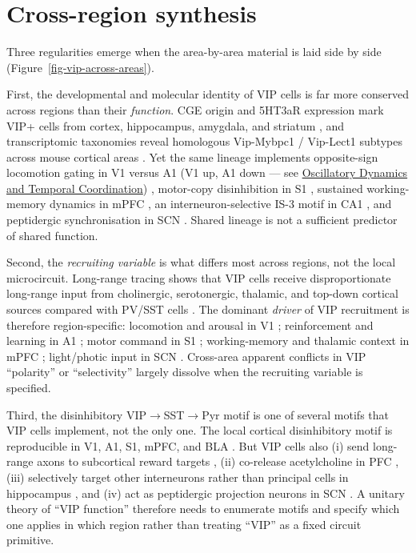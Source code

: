 \documentclass[11pt]{article}
\let\origrightarrow\rightarrow
\def\rightarrow{\ensuremath{\origrightarrow}}
\begin{document}
\section{Cross-region synthesis}

Three regularities emerge when the area-by-area material is laid side by side (Figure~\ref{fig-vip-across-areas}).

First, the developmental and molecular identity of VIP cells is far more conserved across regions than their \textit{function}. CGE origin and 5HT3aR expression mark VIP+ cells from cortex, hippocampus, amygdala, and striatum \citep{Miyoshi2010, Vucurovic2010, Tricoire2011}, and transcriptomic taxonomies reveal homologous Vip-Mybpc1 / Vip-Lect1 subtypes across mouse cortical areas \citep{Scala2021}. Yet the same lineage implements opposite-sign locomotion gating in V1 versus A1 (V1 up, A1 down --- see \href{/oscillatory-dynamics}{Oscillatory Dynamics and Temporal Coordination}) \citep{Dipoppa2018, Pakan2016, Pi2013, Krabbe2019}, motor-copy disinhibition in S1 \citep{Lee2013, Sermet2019}, sustained working-memory dynamics in mPFC \citep{Kamigaki2017, Anastasiades2021a}, an interneuron-selective IS-3 motif in CA1 \citep{Tyan2014, Gulyas1996}, and peptidergic synchronisation in SCN \citep{Maywood2006, Cutler2003, Webb2009, Jones2018}. Shared lineage is not a sufficient predictor of shared function.

Second, the \textit{recruiting variable} is what differs most across regions, not the local microcircuit. Long-range tracing shows that VIP cells receive disproportionate long-range input from cholinergic, serotonergic, thalamic, and top-down cortical sources compared with PV/SST cells \citep{Wall2016, Anastasiades2021a}. The dominant \textit{driver} of VIP recruitment is therefore region-specific: locomotion and arousal in V1 \citep{Dipoppa2018, Pakan2016}; reinforcement and learning in A1 \citep{Pi2013}; motor command in S1 \citep{Lee2013, Sermet2019}; working-memory and thalamic context in mPFC \citep{Kamigaki2017, Anastasiades2021a}; light/photic input in SCN \citep{Jones2018, Todd2020}. Cross-area apparent conflicts in VIP ``polarity'' or ``selectivity'' largely dissolve when the recruiting variable is specified.

Third, the disinhibitory VIP\rightarrow SST\rightarrow Pyr motif is one of several motifs that VIP cells implement, not the only one. The local cortical disinhibitory motif is reproducible in V1, A1, S1, mPFC, and BLA \citep{Pi2013, Lee2013, Dipoppa2018, Krabbe2019, Rhomberg2018}. But VIP cells also (i) send long-range axons to subcortical reward targets \citep{Lee2014b}, (ii) co-release acetylcholine in PFC \citep{Obermayer2019}, (iii) selectively target other interneurons rather than principal cells in hippocampus \citep{Tyan2014, Gulyas1996}, and (iv) act as peptidergic projection neurons in SCN \citep{Maywood2006, Cutler2003, Jones2018}. A unitary theory of ``VIP function'' therefore needs to enumerate motifs and specify which one applies in which region rather than treating ``VIP'' as a fixed circuit primitive.
\end{document}
